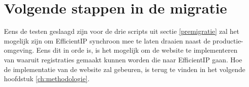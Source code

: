 \section{Volgende stappen in de migratie}
Eens de testen geslaagd zijn voor de drie scripts uit sectie \ref{premigratie} zal het mogelijk zijn om EfficientIP synchroon mee te laten draaien naast de productie-omgeving. Eens dit in orde is, is het mogelijk om de website te implementeren van waaruit registraties gemaakt kunnen worden die naar EfficientIP gaan. Hoe de implementatie van de website zal gebeuren, is terug te vinden in het volgende hoofdstuk \ref{ch:methodologie}.


